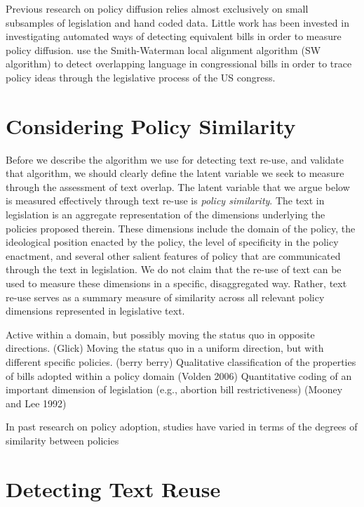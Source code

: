\documentclass[12pt]{article} %
\begin{document}
Previous research on policy diffusion relies almost exclusively on small subsamples of legislation and hand coded data. Little work has been invested in investigating automated ways of detecting equivalent bills in order to measure policy diffusion. 
\citet{wilkerson2015tracing} use the Smith-Waterman local alignment algorithm (SW algorithm) \citep{smith1981identification} to detect overlapping language in congressional bills in order to trace policy ideas through the legislative process of the US congress. 

\section{Considering Policy Similarity}

Before we describe the algorithm we use for detecting text re-use, and validate that algorithm, we should clearly define the latent variable we seek to measure through the assessment of text overlap. The latent variable that we argue below is measured effectively through text re-use is {\em policy similarity}. The text in legislation is an aggregate representation of the dimensions underlying the policies proposed therein. These dimensions include the domain of the policy, the ideological position enacted by the policy, the level of specificity in the policy enactment, and several other salient features of policy that are communicated through the text in legislation. We do not claim that the re-use of text can be used to measure these dimensions in a specific, disaggregated way. Rather, text re-use serves as a summary measure of similarity across all relevant policy dimensions represented in legislative text.

Active within a domain, but possibly moving the status quo in opposite directions. (Glick)
Moving the status quo in a uniform direction, but with different specific policies. (berry berry)
Qualitative classification of the properties of bills adopted within a policy domain (Volden 2006)
Quantitative coding of an important dimension of legislation (e.g., abortion bill restrictiveness) (Mooney and Lee 1992)

In past research on policy adoption, studies have varied in terms of the degrees of similarity between policies 






\section{Detecting Text Reuse}
\end{document}
